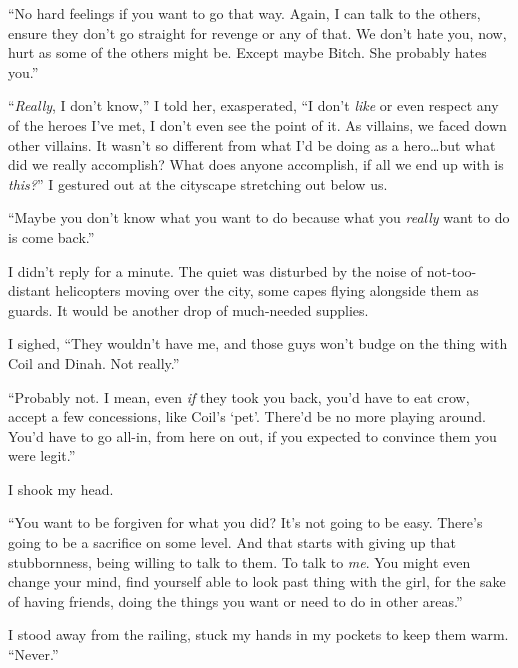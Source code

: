 ``No hard feelings if you want to go that way.  Again, I can talk to the others, ensure they don't go straight for revenge or any of that.  We don't hate you, now, hurt as some of the others might be.  Except maybe Bitch.  She probably hates you.''



``\emph{Really}, I don't know,'' I told her, exasperated, ``I don't \emph{like} or even respect any of the heroes I've met, I don't even see the point of it.  As villains, we faced down other villains.  It wasn't so different from what I'd be doing as a hero\ldots but what did we really accomplish?  What does anyone accomplish, if all we end up with is \emph{this?}'' I gestured out at the cityscape stretching out below us.



``Maybe you don't know what you want to do because what you \emph{really} want to do is come back.''



I didn't reply for a minute.  The quiet was disturbed by the noise of not-too-distant helicopters moving over the city, some capes flying alongside them as guards.  It would be another drop of much-needed supplies.



I sighed, ``They wouldn't have me, and those guys won't budge on the thing with Coil and Dinah.  Not really.''



``Probably not.  I mean, even \emph{if} they took you back, you'd have to eat crow, accept a few concessions, like Coil's `pet'.  There'd be no more playing around.  You'd have to go all-in, from here on out, if you expected to convince them you were legit.''



I shook my head.



``You want to be forgiven for what you did?  It's not going to be easy.  There's going to be a sacrifice on some level.  And that starts with giving up that stubbornness, being willing to talk to them.  To talk to \emph{me}.  You might even change your mind, find yourself able to look past thing with the girl, for the sake of having friends, doing the things you want or need to do in other areas.''



I stood away from the railing, stuck my hands in my pockets to keep them warm.  ``Never.''



